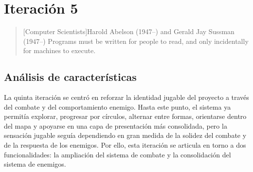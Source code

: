 \chapter{Iteración 5}

\begin{quotation}[Computer Scientists]{Harold Abelson (1947--) and Gerald Jay Sussman (1947--)}
Programs must be written for people to read, and only incidentally for machines to execute.
\end{quotation}

\begin{abstract}
Esta iteración se centra en el núcleo jugable del combate. En ella se incorporan los
sistemas de combate y de enemigos que permiten definir interacciones ofensivas, tipos de
comportamiento y respuesta al daño.
\end{abstract}

\section{Análisis de características}
La quinta iteración se centró en reforzar la identidad jugable del proyecto a través del
combate y del comportamiento enemigo. Hasta este punto, el sistema ya permitía explorar,
progresar por círculos, alternar entre formas, orientarse dentro del mapa y apoyarse en una
capa de presentación más consolidada, pero la sensación jugable seguía dependiendo en gran
medida de la solidez del combate y de la respuesta de los enemigos. Por ello, esta
iteración se articula en torno a dos funcionalidades: la ampliación del sistema de combate
y la consolidación del sistema de enemigos.

